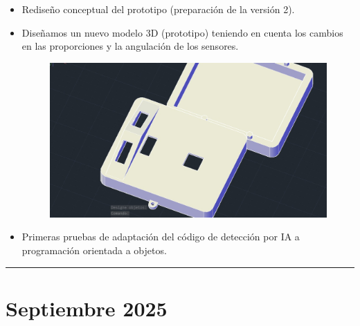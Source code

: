 \documentclass[12pt,a4paper]{article}
\newcommand{\separador}{\vspace{0.5cm}\noindent\rule{\linewidth}{0.5pt}\vspace{0.5cm}}
\begin{document}
\begin{itemize}
\item Rediseño conceptual del prototipo (preparación de la  versión 2).

\item Diseñamos un nuevo modelo 3D (prototipo) teniendo en cuenta los cambios en las proporciones y la angulación de los sensores.

\begin{figure}[H]
    \centering
    \includegraphics[width=0.75\linewidth]{Carpeta de campo/segundo proto.png}
\end{figure}

\item Primeras pruebas de adaptación del código de detección por IA a programación orientada a objetos.


\end{itemize}


\separador

\section*{Septiembre 2025}
\end{document}
